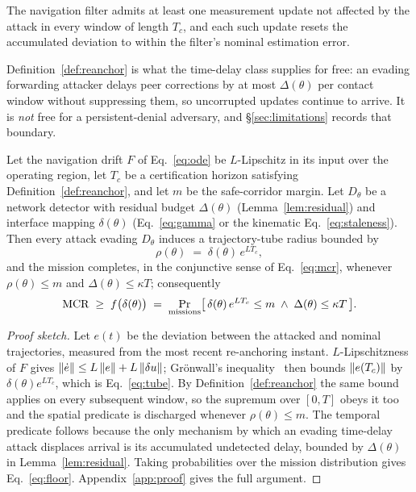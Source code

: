 \begin{definition}
\label{def:reanchor}
The navigation filter admits at least one measurement update not affected by the
attack in every window of length $T_c$, and each such update resets the
accumulated deviation to within the filter's nominal estimation error.
\end{definition}

Definition~\ref{def:reanchor} is what the time-delay class supplies for free: an
evading forwarding attacker delays peer corrections by at most $\Delta(\theta)$
per contact window without suppressing them, so uncorrupted updates continue to
arrive. It is \emph{not} free for a persistent-denial adversary, and
\S\ref{sec:limitations} records that boundary.

\begin{theorem}
\label{thm:main}
Let the navigation drift $F$ of Eq.~\eqref{eq:ode} be $L$-Lipschitz in its input
over the operating region, let $T_c$ be a certification horizon satisfying
Definition~\ref{def:reanchor}, and let $m$ be the safe-corridor margin. Let
$D_\theta$ be a network detector with residual budget $\Delta(\theta)$
(Lemma~\ref{lem:residual}) and interface mapping $\delta(\theta)$
(Eq.~\eqref{eq:gamma} or the kinematic Eq.~\eqref{eq:staleness}). Then every attack
evading $D_\theta$ induces a trajectory-tube radius bounded by
\begin{equation}
\label{eq:tube}
\rho(\theta) \;=\; \delta(\theta)\,e^{L T_c},
\end{equation}
and the mission completes, in the conjunctive sense of Eq.~\eqref{eq:mcr},
whenever $\rho(\theta)\le m$ and $\Delta(\theta)\le\kappa T$; consequently
\begin{equation}
\label{eq:floor}
\mathrm{MCR} \;\ge\; f\big(\delta(\theta)\big) \;=\;
\Pr_{\text{missions}}\!\big[\,\delta(\theta)\,e^{LT_c}\le m
\;\wedge\; \Delta(\theta)\le\kappa T\,\big].
\end{equation}
\end{theorem}
\begin{proof}[Proof sketch]
Let $e(t)$ be the deviation between the attacked and nominal trajectories,
measured from the most recent re-anchoring instant. $L$-Lipschitzness of $F$
gives $\left\lVert \dot e\right\rVert\le L\left\lVert e\right\rVert+L\left\lVert \delta u\right\rVert$; Gr\"onwall's
inequality~\cite{gronwall1919} then bounds $\left\lVert e(T_c)\right\rVert$ by
$\delta(\theta)e^{LT_c}$, which is Eq.~\eqref{eq:tube}. By
Definition~\ref{def:reanchor} the same bound applies on every subsequent window,
so the supremum over $[0,T]$ obeys it too and the spatial
predicate is discharged whenever $\rho(\theta)\le m$. The temporal predicate follows because
the only mechanism by which an evading time-delay attack displaces arrival is
its accumulated undetected delay, bounded by $\Delta(\theta)$ in
Lemma~\ref{lem:residual}. Taking probabilities over the mission distribution
gives Eq.~\eqref{eq:floor}. Appendix~\ref{app:proof} gives the full argument.
\end{proof}

